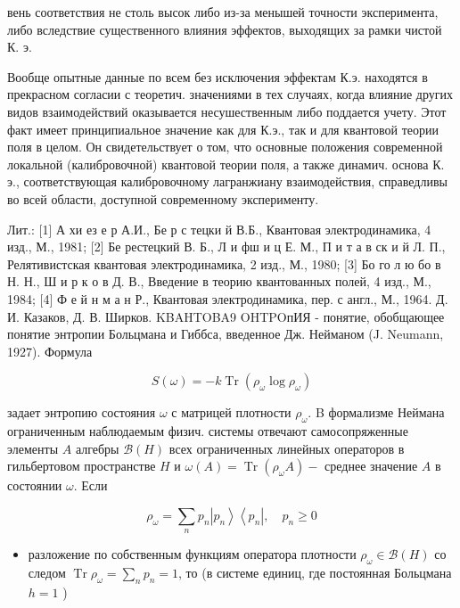 \documentclass[10pt]{article}
\begin{document}
вень соответствия не столь высок либо из-за менышей точности эксперимента, либо вследствие существенного влияния эффектов, выходящих за рамки чистой К. э.



Вообще опытные данные по всем без исключения эффектам К.э. находятся в прекрасном согласии с теоретич. значениями в тех случаях, когда влияние других видов взаимодействий оказывается несушественным либо поддается учету. Этот факт имеет принципиальное значение как для К.э., так и для квантовой теории поля в целом. Он свидетельствует о том, что основные положения современной локальной (калибровочной) квантовой теории поля, а также динамич. основа К. э., соответствующая калибровочному лагранжиану взаимодействия, справедливы во всей области, доступной современному эксперименту.



Лит.: [1] А хи ез е р А.И., Бе р с тецки й В.Б., Квантовая электродинамика, 4 изд., М., 1981; [2] Бе рестецкий В. Б., Л и фш и ц Е. М., П и т а в ск и й Л. П., Релятивистская квантовая электродинамика, 2 изд., М., 1980; [3] Бо го л ю бо в Н. Н., Ш и р к о в Д. В., Введение в теорию квантованных полей, 4 изд., М., 1984; [4] Ф е й н м а н Р., Квантовая электродинамика, пер. с англ., М., 1964. Д. И. Казаков, Д. В. Ширков. KBAHTOBA9 OHTPOпИЯ - понятие, обобщающее понятие энтропии Больцмана и Гиббса, введенное Дж. Нейманом (J. Neumann, 1927). Формула



\[

S(\omega)=-k \operatorname{Tr}\left(\rho_{\omega} \log \rho_{\omega}\right)

\]



задает энтропию состояния $\omega$ с матрицей плотности $\rho_{\omega}$. B формализме Неймана ограниченным наблюдаемым физич. системы отвечают самосопряженные элементы $A$ алгебры $\mathscr{B}(H)$ всех ограниченных линейных операторов в гильбертовом пространстве $H$ и $\omega(A)=\operatorname{Tr}\left(\rho_{\omega} A\right)-$ среднее значение $A$ в состоянии $\omega$. Если



\[

\rho_{\omega}=\sum_{n} p_{n}\left|p_{n}\right\rangle\left\langle p_{n}\right|, \quad p_{n} \geqslant 0

\]



\begin{itemize}

  \item разложение по собственным функциям оператора плотности $\rho_{\omega} \in \mathscr{B}(H)$ со следом $\operatorname{Tr} \rho_{\omega}=\sum_{n} p_{n}=1$, то (в системе единиц, где постоянная Больцмана $h=1$ )

\end{itemize}
\end{document}
